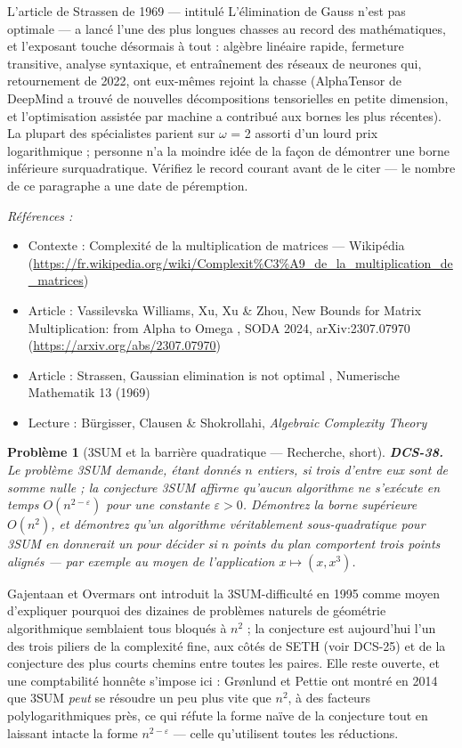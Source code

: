 \documentclass[11pt]{article}
\newtheorem{problem}{Problème}
\newenvironment{refs}{\par\small\noindent\emph{Références :}\begin{itemize}\setlength\itemsep{0pt}}{\end{itemize}\normalsize}
\begin{document}
\noindent L'article de Strassen de 1969 --- intitulé \og{} L'élimination de Gauss n'est pas optimale \fg{} --- a lancé l'une des plus longues chasses au record des mathématiques, et l'exposant touche désormais à tout : algèbre linéaire rapide, fermeture transitive, analyse syntaxique, et entraînement des réseaux de neurones qui, retournement de 2022, ont eux-mêmes rejoint la chasse (AlphaTensor de DeepMind a trouvé de nouvelles décompositions tensorielles en petite dimension, et l'optimisation assistée par machine a contribué aux bornes les plus récentes). La plupart des spécialistes parient sur $\omega$ = 2 assorti d'un lourd prix logarithmique ; personne n'a la moindre idée de la façon de démontrer une borne inférieure surquadratique. Vérifiez le record courant avant de le citer --- le nombre de ce paragraphe a une date de péremption.

\begin{refs}
\item Contexte : Complexité de la multiplication de matrices --- Wikipédia (\url{https://fr.wikipedia.org/wiki/Complexit%C3%A9_de_la_multiplication_de_matrices})
\item Article : Vassilevska Williams, Xu, Xu \& Zhou, \og{} New Bounds for Matrix Multiplication: from Alpha to Omega \fg{}, SODA 2024, arXiv:2307.07970 (\url{https://arxiv.org/abs/2307.07970})
\item Article : Strassen, \og{} Gaussian elimination is not optimal \fg{}, Numerische Mathematik 13 (1969)
\item Lecture : Bürgisser, Clausen \& Shokrollahi, \textit{Algebraic Complexity Theory}
\end{refs}

\bigskip

\begin{problem}[{3SUM et la barrière quadratique --- Recherche, short}]
\textbf{DCS-38.} Le problème 3SUM demande, étant donnés $n$ entiers, si trois d'entre eux sont de somme nulle ; la conjecture 3SUM affirme qu'aucun algorithme ne s'exécute en temps $O(n^{2-\varepsilon})$ pour une constante $\varepsilon > 0$. Démontrez la borne supérieure $O(n^2)$, et démontrez qu'un algorithme véritablement sous-quadratique pour 3SUM en donnerait un pour décider si $n$ points du plan comportent trois points alignés --- par exemple au moyen de l'application $x \mapsto (x, x^3)$.
\end{problem}

\noindent Gajentaan et Overmars ont introduit la 3SUM-difficulté en 1995 comme moyen d'expliquer pourquoi des dizaines de problèmes naturels de géométrie algorithmique semblaient tous bloqués à $n^2$ ; la conjecture est aujourd'hui l'un des trois piliers de la complexité fine, aux côtés de SETH (voir DCS-25) et de la conjecture des plus courts chemins entre toutes les paires. Elle reste ouverte, et une comptabilité honnête s'impose ici : Grønlund et Pettie ont montré en 2014 que 3SUM \textit{peut} se résoudre un peu plus vite que $n^2$, à des facteurs polylogarithmiques près, ce qui réfute la forme naïve de la conjecture tout en laissant intacte la forme $n^{2-\varepsilon}$ --- celle qu'utilisent toutes les réductions.
\end{document}
